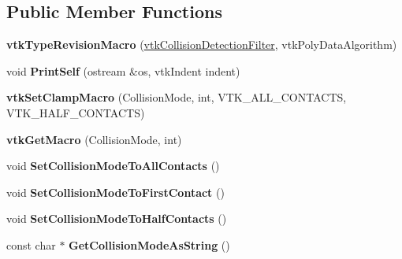 \subsection*{Public Member Functions}
\begin{DoxyCompactItemize}
\item 
\hypertarget{classvtkCollisionDetectionFilter_ac9eeeaed9c8ea326518b32f85e9f4f40}{
{\bfseries vtkTypeRevisionMacro} (\hyperlink{classvtkCollisionDetectionFilter}{vtkCollisionDetectionFilter}, vtkPolyDataAlgorithm)}
\label{classvtkCollisionDetectionFilter_ac9eeeaed9c8ea326518b32f85e9f4f40}

\item 
\hypertarget{classvtkCollisionDetectionFilter_ab71ccf77152396e086bd057fe8c4d5c1}{
void {\bfseries PrintSelf} (ostream \&os, vtkIndent indent)}
\label{classvtkCollisionDetectionFilter_ab71ccf77152396e086bd057fe8c4d5c1}

\item 
\hypertarget{classvtkCollisionDetectionFilter_ab120291d445f948e4dc20e5ec3cbefb8}{
{\bfseries vtkSetClampMacro} (CollisionMode, int, VTK\_\-ALL\_\-CONTACTS, VTK\_\-HALF\_\-CONTACTS)}
\label{classvtkCollisionDetectionFilter_ab120291d445f948e4dc20e5ec3cbefb8}

\item 
\hypertarget{classvtkCollisionDetectionFilter_afc1e5be95eb70457c46df8f24b8ab224}{
{\bfseries vtkGetMacro} (CollisionMode, int)}
\label{classvtkCollisionDetectionFilter_afc1e5be95eb70457c46df8f24b8ab224}

\item 
\hypertarget{classvtkCollisionDetectionFilter_ad19501102466ba8e82932bfa0d348e4d}{
void {\bfseries SetCollisionModeToAllContacts} ()}
\label{classvtkCollisionDetectionFilter_ad19501102466ba8e82932bfa0d348e4d}

\item 
\hypertarget{classvtkCollisionDetectionFilter_a248069cda68f8dc5ce95d9d756aa74f4}{
void {\bfseries SetCollisionModeToFirstContact} ()}
\label{classvtkCollisionDetectionFilter_a248069cda68f8dc5ce95d9d756aa74f4}

\item 
\hypertarget{classvtkCollisionDetectionFilter_a932c19078b9d200585cb037e752e2f4c}{
void {\bfseries SetCollisionModeToHalfContacts} ()}
\label{classvtkCollisionDetectionFilter_a932c19078b9d200585cb037e752e2f4c}

\item 
\hypertarget{classvtkCollisionDetectionFilter_abc0c111f63fa38cdeb5bd07f64c9c9c4}{
const char $\ast$ {\bfseries GetCollisionModeAsString} ()}
\label{classvtkCollisionDetectionFilter_abc0c111f63fa38cdeb5bd07f64c9c9c4}


\end{DoxyCompactItemize}
